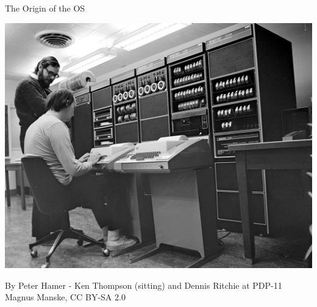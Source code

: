 \documentclass[unknownkeysallowed, 10pt, a4 paper, handout]{beamer}
\begin{document}
\begin{frame}[label=pdp11]{The Origin of the OS}
  \begin{center}
    \includegraphics[scale=3.5]{pics/pdp11.jpg}
  \end{center}
  \begin{flushright}
    \tiny{By Peter Hamer - Ken Thompson (sitting) and Dennis Ritchie at
    PDP-11 Magnus Manske, CC BY-SA 2.0}
  \end{flushright}
\end{frame}
\end{document}
